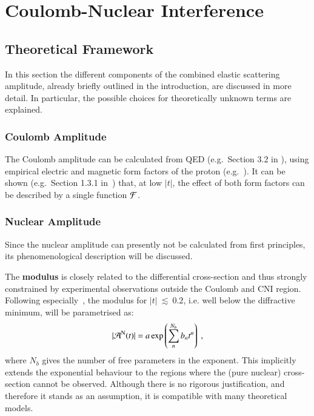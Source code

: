 \section{Coulomb-Nuclear Interference}
\label{sec:coulomb}


\subsection{Theoretical Framework}
\label{sec:cni_framework}

In this section the different components of the combined elastic scattering amplitude, already briefly outlined in the introduction, are discussed in more detail. In particular, the possible choices for theoretically unknown terms are explained.

\subsubsection{Coulomb Amplitude}
%
The Coulomb amplitude can be calculated from QED (e.g.~Section 3.2 in \cite{block06}), using empirical electric and magnetic form factors of the proton (e.g.~\cite{puckett10}). It can be shown (e.g.~Section 1.3.1 in~\cite{jan_thesis}) that, at low $|t|$, the effect of both form factors can be described by a single function ${\cal F}$. 


\subsubsection{Nuclear Amplitude}
%
Since the nuclear amplitude can presently not be calculated from first principles, its phenomenological description will be discussed.

The {\bf modulus} is closely related to the differential cross-section and thus strongly constrained by experimental observations outside the Coulomb and CNI region. Following especially~\cite{8tev-90m}, the modulus for $|t|~\lesssim~0.2$, i.e. well below the diffractive minimum, will be parametrised as:
\begin{equation}
\label{eq:nuc mod}
| {\cal A}^{\rm N}(t) | = a \exp\left( \sum\limits_{n}^{N_b} b_n t^n \right)\ ,
\end{equation}
where $N_b$ gives the number of free parameters in the exponent. This implicitly extends the exponential behaviour to the regions where the (pure nuclear) cross-section cannot be observed. Although there is no rigorous justification, and therefore it stands as an assumption, it is compatible with many theoretical models.

